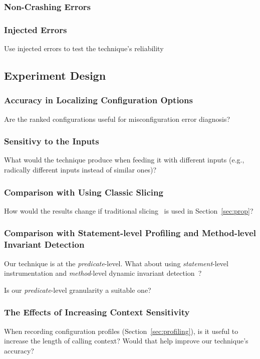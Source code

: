 \subsubsection{Non-Crashing Errors}

\subsubsection{Injected Errors}

Use injected errors to test the technique's reliability

\subsection{Experiment Design}



\subsubsection{Accuracy in Localizing Configuration Options}


Are the ranked configurations useful for misconfiguration error diagnosis?

\subsubsection{Sensitivy to the Inputs}

What would the technique produce when feeding it with different inputs (e.g.,
radically different inputs instead of similar ones)?

\subsubsection{Comparison with Using Classic Slicing}

How would the results change if traditional slicing~\cite{Horwitz:1988} is used
in Section~\ref{sec:prop}?

\subsubsection{Comparison with Statement-level Profiling and Method-level Invariant Detection}

Our technique is at the \textit{predicate}-level. What about using
\textit{statement}-level instrumentation and \textit{method}-level dynamic invariant detection~\cite{Ernst:1999}?

Is our \textit{predicate}-level granularity a suitable one?

\subsubsection{The Effects of Increasing Context Sensitivity}

When recording configuration profiles (Section~\ref{sec:profiling}), is it useful
to increase the length of calling context? Would that help improve our technique's accuracy?
